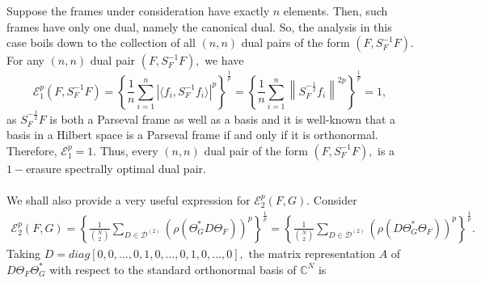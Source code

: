 \documentclass[final,1p,times]{elsarticle}
\begin{document}
\vspace{1.5mm}
\par Suppose the frames under consideration have exactly $n$ elements. Then, such  frames have only one dual, namely the canonical dual. So, the analysis in this case boils down to the collection of all $(n,n)$ dual pairs of the form $(F,S_{F}^{-1}F).$ For any $(n,n)$ dual pair $(F,S_{F}^{-1}F),$ we have  
$$\mathcal{E}_{1}^p (F,S_{F}^{-1}F) = \left\{\frac{1}{n} \sum\limits_{i=1}^n \left|\langle f_i, S_{F}^{-1}f_i \rangle \right|^p\right\}^{\frac{1}{p}} = \left\{\frac{1}{n} \sum\limits_{i=1}^n \left\| S_{F}^{-\frac{1}{2}}f_i  \right\|^{2p}\right\}^{\frac{1}{p}}=1,$$
as  $S_{F}^{-\frac{1}{2}}F$ is both a Parseval frame as well as a basis and it is well-known that  a basis in a Hilbert space is a Parseval frame if and only if it is orthonormal. Therefore, $\mathcal{E}_{1}^p  = 1.$ Thus, every $(n,n)$ dual pair of the form $(F,S_{F}^{-1}F),$  is a $1-$erasure spectrally optimal dual pair. \\~\\
	We shall also provide a very useful expression for $\mathcal{E}_{2}^p (F,G).$ Consider
\begin{eqnarray*}
\mathcal{E}_{2}^p (F,G) = \left\{\frac{1}{\binom{N}{2}} \sum\limits_{D \in \mathcal{D}^{(2)}}\left( \rho( \Theta_{G}^*D\Theta_{F})\right)^p\right\}^{\frac{1}{p}} = \left\{\frac{1}{\binom{N}{2}} \sum\limits_{D \in \mathcal{D}^{(2)}}\left( \rho( D\Theta_{G}^*\Theta_{F})\right)^p\right\}^{\frac{1}{p}}.
\end{eqnarray*}
Taking  $D = diag [0,0,\ldots,0,1,0,\ldots,0,1,0,\ldots,0],$ the matrix representation $A$ of $D\Theta_{F}\Theta_{G}^*$ with respect to the standard orthonormal basis of $\mathbb{C}^N$ is
\end{document}
